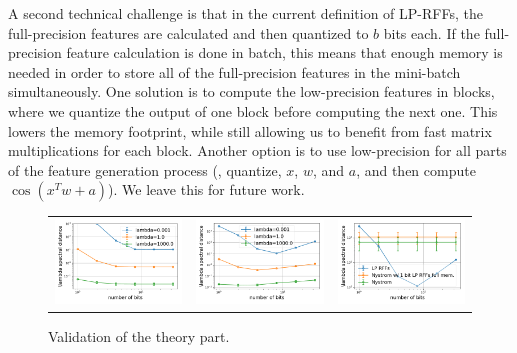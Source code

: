 A second technical challenge is that in the current definition of LP-RFFs, the full-precision features are calculated and then quantized to $b$ bits each. If the full-precision feature calculation is done in batch, this means that enough memory is needed in order to store all of the full-precision features in the mini-batch simultaneously. One solution is to compute the low-precision features in blocks, where we quantize the output of one block before computing the next one. This lowers the memory footprint, while still allowing us to benefit from fast matrix multiplications for each block. Another option is to use low-precision for all parts of the feature generation process (\eg, quantize, $x$, $w$, and $a$, and then compute $\cos(x^T w + a)$).  We leave this for future work.

\begin{figure}
	\centering
	\begin{tabular}{c c c}
		\includegraphics[width=0.3\linewidth]{figures/theory_fixed_n_feat.pdf} &
		\includegraphics[width=0.3\linewidth]{figures/theory_fixed_memory.pdf} &
		\includegraphics[width=0.3\linewidth]{figures/theory_fixed_memory_generous_mem_to_nystrom_lamb_0001.pdf} 
	\end{tabular}
\caption{Validation of the theory part. }
\label{fig:theo_validation}
\end{figure}


